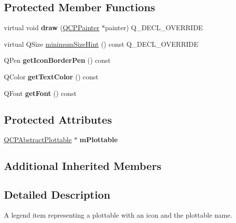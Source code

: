 \subsection*{Protected Member Functions}
\begin{DoxyCompactItemize}
\item 
\mbox{\label{class_q_c_p_plottable_legend_item_a5838366619200e99680afa6d355d13fa}} 
virtual void {\bfseries draw} (\hyperlink{class_q_c_p_painter}{Q\+C\+P\+Painter} $\ast$painter) Q\+\_\+\+D\+E\+C\+L\+\_\+\+O\+V\+E\+R\+R\+I\+DE
\item 
virtual Q\+Size \hyperlink{class_q_c_p_plottable_legend_item_a923b8b0e2b888cbb00abae0783edf509}{minimum\+Size\+Hint} () const Q\+\_\+\+D\+E\+C\+L\+\_\+\+O\+V\+E\+R\+R\+I\+DE
\item 
\mbox{\label{class_q_c_p_plottable_legend_item_afa81a8bd4434ec249efbbfc2a030a752}} 
Q\+Pen {\bfseries get\+Icon\+Border\+Pen} () const
\item 
\mbox{\label{class_q_c_p_plottable_legend_item_a55daaffee35326765deebf8271efe210}} 
Q\+Color {\bfseries get\+Text\+Color} () const
\item 
\mbox{\label{class_q_c_p_plottable_legend_item_a77d980f594046226f9ac075fa07244b3}} 
Q\+Font {\bfseries get\+Font} () const
\end{DoxyCompactItemize}
\subsection*{Protected Attributes}
\begin{DoxyCompactItemize}
\item 
\mbox{\label{class_q_c_p_plottable_legend_item_ada647fb4b22971a1a424e15b4f6af0d9}} 
\hyperlink{class_q_c_p_abstract_plottable}{Q\+C\+P\+Abstract\+Plottable} $\ast$ {\bfseries m\+Plottable}
\end{DoxyCompactItemize}
\subsection*{Additional Inherited Members}


\subsection{Detailed Description}
A legend item representing a plottable with an icon and the plottable name. 

